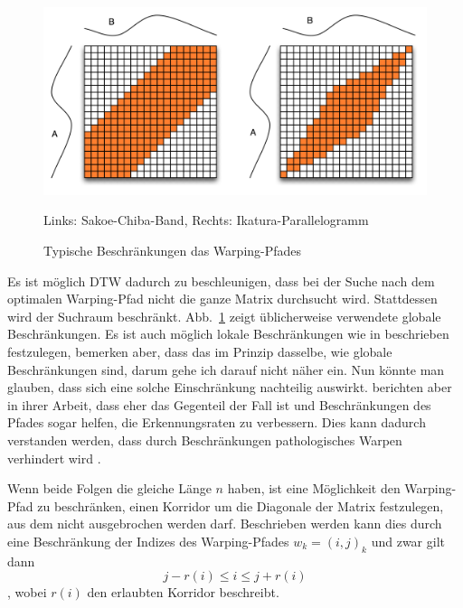 \begin{figure}
  \centering \includegraphics[width=\textwidth]{figures/constraints.png}
  \caption{Typische Beschränkungen das Warping-Pfades}
   Links: Sakoe-Chiba-Band, Rechts: Ikatura-Parallelogramm
  \label{fig:constraints}
\end{figure}


Es ist möglich DTW dadurch zu beschleunigen, dass bei der Suche nach dem optimalen Warping-Pfad nicht die ganze Matrix durchsucht wird. Stattdessen wird der Suchraum beschränkt. Abb.~\ref{fig:constraints} zeigt üblicherweise verwendete globale Beschränkungen. Es ist auch möglich lokale Beschränkungen wie in \cite{Rabiner:1993p11752} beschrieben festzulegen, \citet{Keogh:2005p7751} bemerken aber, dass das im Prinzip dasselbe, wie globale Beschränkungen sind, darum gehe ich darauf nicht näher ein. Nun könnte man glauben, dass sich eine solche Einschränkung nachteilig auswirkt. \citet{Ratanamahatana:2004p7522} berichten aber in ihrer Arbeit, dass eher das Gegenteil der Fall ist und Beschränkungen des Pfades sogar helfen, die Erkennungsraten zu verbessern. Dies kann dadurch verstanden werden, dass durch Beschränkungen pathologisches Warpen verhindert wird \cite{Keogh:2005p7751}.

Wenn beide Folgen die gleiche Länge $n$ haben, ist eine Möglichkeit den Warping-Pfad zu beschränken, einen Korridor um die Diagonale der Matrix festzulegen, aus dem nicht ausgebrochen werden darf. Beschrieben werden kann dies durch eine Beschränkung der Indizes des Warping-Pfades \( w_k = (i,j)_k \) und zwar gilt dann
\begin{equation}
  \label{eq:constraints}
  j−r(i) \leq i \leq j+r(i)
\end{equation}
, wobei $r(i)$ den erlaubten Korridor beschreibt.

